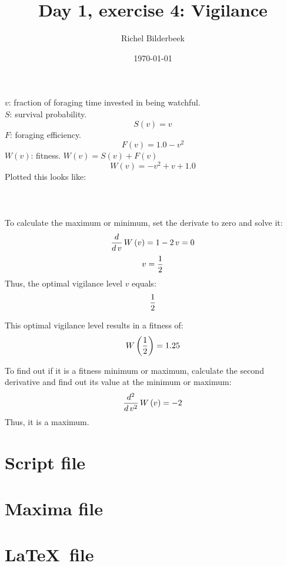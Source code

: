 \documentclass{article}
\title{Day 1, exercise 4: Vigilance}
\author{Richel Bilderbeek}
\date{\today}
\begin{document}
\maketitle

$v$: fraction of foraging time invested in being watchful.\\
$S$: survival probability.
$$S\left(v\right)=v$$
$F$: foraging efficiency.
$$F\left(v\right)=1.0-v^2$$
$W(v)$: fitness.
$W(v) = S(v) + F(v)$
$$W\left(v\right)=-v^2+v+1.0$$
Plotted this looks like:\\\\
\\\\
To calculate the maximum or minimum, set the derivate to zero and solve it:
$${{d}\over{d\,v}}\,W\left(v\right)=1-2\,v=0$$
$$v={{1}\over{2}}$$
Thus, the optimal vigilance level $v$ equals:$${{1}\over{2}}$$

This optimal vigilance level results in a fitness of:$$W\left({{1}\over{2}}\right)=1.25$$

To find out if it is a fitness minimum or maximum,
calculate the second derivative
and find out its value at the minimum or maximum:
$${{d^2}\over{d\,v^2}}\,W\left(v\right)=-2$$
Thus, it is a maximum.

\appendix

\section{Script file}



\section{Maxima file}



\section{\LaTeX~file}


\end{document}
